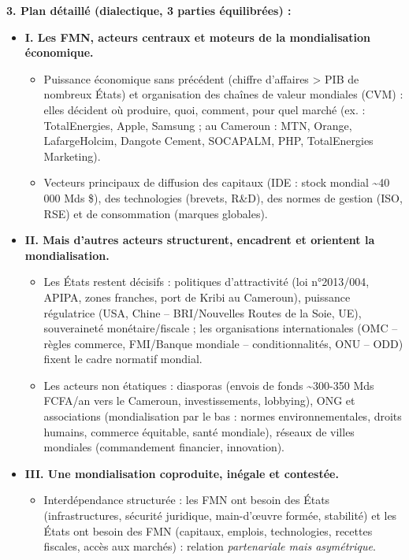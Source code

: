 \documentclass[11pt]{article}
\newcommand{\cle}[1]{{\popxbold\color{popdark}#1}}
\begin{document}
\begin{corrige}
\textbf{3. Plan détaillé (dialectique, 3 parties équilibrées) :}
\begin{itemize}
    \item \textbf{I. Les FMN, acteurs centraux et moteurs de la mondialisation économique.}
    \begin{itemize}
        \item[a)] Puissance économique sans précédent (chiffre d'affaires > PIB de nombreux États) et organisation des \cle{chaînes de valeur mondiales} (CVM) : elles décident où produire, quoi, comment, pour quel marché (ex. : TotalEnergies, Apple, Samsung ; au Cameroun : MTN, Orange, LafargeHolcim, Dangote Cement, SOCAPALM, PHP, TotalEnergies Marketing).
        \item[b)] Vecteurs principaux de diffusion des capitaux (\cle{IDE} : stock mondial \textasciitilde 40\,000 Mds \$), des technologies (brevets, R\&D), des normes de gestion (ISO, RSE) et de consommation (marques globales).
    \end{itemize}
    \item \textbf{II. Mais d'autres acteurs structurent, encadrent et orientent la mondialisation.}
    \begin{itemize}
        \item[a)] Les \cle{États} restent décisifs : politiques d'attractivité (loi n°2013/004, APIPA, zones franches, port de Kribi au Cameroun), puissance régulatrice (USA, Chine -- BRI/Nouvelles Routes de la Soie, UE), souveraineté monétaire/fiscale ; les \cle{organisations internationales} (OMC -- règles commerce, FMI/Banque mondiale -- conditionnalités, ONU -- ODD) fixent le cadre normatif mondial.
        \item[b)] Les \cle{acteurs non étatiques} : diasporas (envois de fonds \textasciitilde 300-350 Mds FCFA/an vers le Cameroun, investissements, lobbying), ONG et associations (mondialisation par le bas : normes environnementales, droits humains, commerce équitable, santé mondiale), réseaux de villes mondiales (commandement financier, innovation).
    \end{itemize}
    \item \textbf{III. Une mondialisation coproduite, inégale et contestée.}
    \begin{itemize}
        \item[a)] Interdépendance structurée : les FMN ont besoin des États (infrastructures, sécurité juridique, main-d'œuvre formée, stabilité) et les États ont besoin des FMN (capitaux, emplois, technologies, recettes fiscales, accès aux marchés) : relation \emph{partenariale mais asymétrique}.

\end{itemize}
\end{itemize}
\end{corrige}
\end{document}
